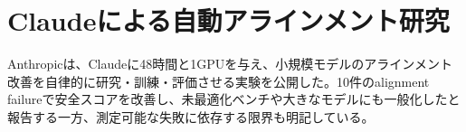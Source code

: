 \section{Claudeによる自動アラインメント研究}
Anthropicは、Claudeに48時間と1GPUを与え、小規模モデルのアラインメント改善を自律的に研究・訓練・評価させる実験を公開した。10件のalignment failureで安全スコアを改善し、未最適化ベンチや大きなモデルにも一般化したと報告する一方、測定可能な失敗に依存する限界も明記している。
